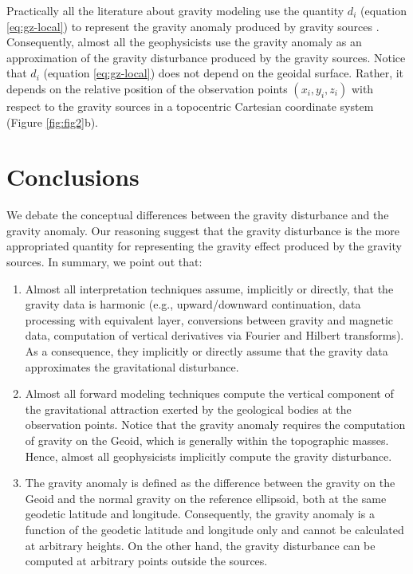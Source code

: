 \documentclass[extra]{gji}
\begin{document}
Practically all the literature about gravity modeling
use the quantity $d_{i}$ (equation \ref{eq:gz-local})
to represent the gravity anomaly produced by 
gravity sources \citep[e.g.,][]{blakely1996}. 
Consequently, almost all the geophysicists use the gravity
anomaly as an approximation of the gravity disturbance
produced by the gravity sources. Notice that $d_{i}$ 
(equation \ref{eq:gz-local}) does not depend on the
geoidal surface. Rather, it depends on the relative position 
of the observation points $(x_{i}, y_{i}, z_{i})$ with respect to
the gravity sources in a topocentric Cartesian coordinate
system (Figure \ref{fig:fig2}b).


\section{Conclusions}

We debate the conceptual differences between the gravity
disturbance and the gravity anomaly.
Our reasoning suggest that the gravity disturbance is the
more appropriated quantity for representing the gravity
effect produced by the gravity sources.
In summary, we point out that:

\begin{enumerate}
\renewcommand{\theenumii}{\alph{enumii}}

\item Almost all interpretation techniques assume, implicitly or
directly, that the gravity data is harmonic (e.g., 
upward/downward continuation, 
data processing with equivalent layer,
conversions between gravity and magnetic data,
computation of vertical derivatives via Fourier and Hilbert
transforms). As a consequence, they implicitly or directly assume that
the gravity data approximates the gravitational disturbance.

\item Almost all forward modeling techniques compute
the vertical component of the gravitational attraction 
exerted by the geological bodies at the observation points.
Notice that the gravity anomaly requires the computation of gravity
on the Geoid, which is generally within the topographic masses.
Hence, almost all geophysicists implicitly compute 
the gravity disturbance.

\item The gravity anomaly is defined as the difference between 
the gravity on the Geoid and the normal gravity on the reference 
ellipsoid, both at the same geodetic latitude and longitude.
Consequently, the gravity anomaly is a function of
the geodetic latitude and longitude only and cannot
be calculated at arbitrary heights. On the other hand,
the gravity disturbance can be computed at arbitrary points
outside the sources.

\end{enumerate}
\end{document}
